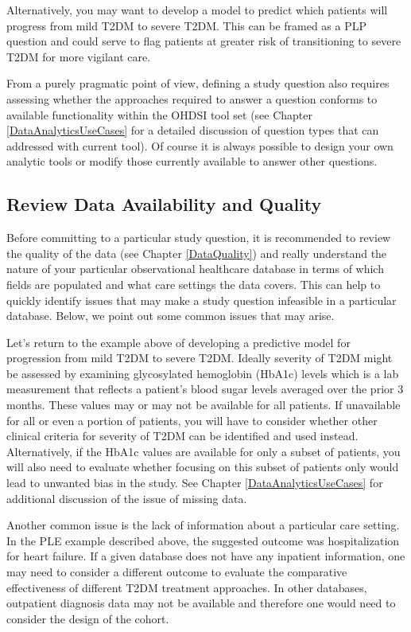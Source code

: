 \documentclass[11pt]{book}
\theoremstyle{definition}
\theoremstyle{definition}
\theoremstyle{definition}
\theoremstyle{remark}
\begin{document}
Alternatively, you may want to develop a model to predict which patients
will progress from mild T2DM to severe T2DM. This can be framed as a PLP
question and could serve to flag patients at greater risk of
transitioning to severe T2DM for more vigilant care.

From a purely pragmatic point of view, defining a study question also
requires assessing whether the approaches required to answer a question
conforms to available functionality within the OHDSI tool set (see
Chapter \ref{DataAnalyticsUseCases} for a detailed discussion of
question types that can addressed with current tool). Of course it is
always possible to design your own analytic tools or modify those
currently available to answer other questions.

\subsection{Review Data Availability and
Quality}\label{review-data-availability-and-quality}

Before committing to a particular study question, it is recommended to
review the quality of the data (see Chapter \ref{DataQuality}) and
really understand the nature of your particular observational healthcare
database in terms of which fields are populated and what care settings
the data covers. This can help to quickly identify issues that may make
a study question infeasible in a particular database. Below, we point
out some common issues that may arise.

Let's return to the example above of developing a predictive model for
progression from mild T2DM to severe T2DM. Ideally severity of T2DM
might be assessed by examining glycosylated hemoglobin (HbA1c) levels
which is a lab measurement that reflects a patient's blood sugar levels
averaged over the prior 3 months. These values may or may not be
available for all patients. If unavailable for all or even a portion of
patients, you will have to consider whether other clinical criteria for
severity of T2DM can be identified and used instead. Alternatively, if
the HbA1c values are available for only a subset of patients, you will
also need to evaluate whether focusing on this subset of patients only
would lead to unwanted bias in the study. See Chapter
\ref{DataAnalyticsUseCases} for additional discussion of the issue of
missing data.

Another common issue is the lack of information about a particular care
setting. In the PLE example described above, the suggested outcome was
hospitalization for heart failure. If a given database does not have any
inpatient information, one may need to consider a different outcome to
evaluate the comparative effectiveness of different T2DM treatment
approaches. In other databases, outpatient diagnosis data may not be
available and therefore one would need to consider the design of the
cohort.
\end{document}
